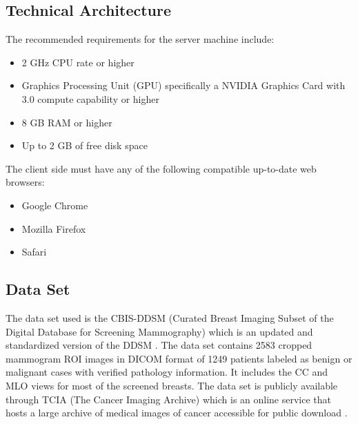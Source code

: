 \subsection{Technical Architecture}
\qquad The recommended requirements for the server machine include:

\begin{itemize}
	\item 2 GHz CPU rate or higher
	\item Graphics Processing Unit (GPU) specifically a NVIDIA Graphics Card with 3.0 compute capability or higher
	\item 8 GB RAM or higher
	\item Up to 2 GB of free disk space
\end{itemize}

	The client side must have any of the following compatible up-to-date web browsers:

\begin{itemize}
	\item Google Chrome
	\item Mozilla Firefox
	\item Safari
\end{itemize}

\subsection{Data Set}
\qquad The data set used is the CBIS-DDSM (Curated Breast Imaging Subset of the Digital Database for Screening Mammography) which is an updated and standardized version of the DDSM \cite{CBIS-DDSM}. The data set contains 2583 cropped mammogram ROI images in DICOM format of 1249 patients labeled as benign or malignant cases with verified pathology information. It includes the CC and MLO views for most of the screened breasts. The data set is publicly available through TCIA (The Cancer Imaging Archive) which is an online service that hosts a large archive of medical images of cancer accessible for public download \cite{TCIA}.